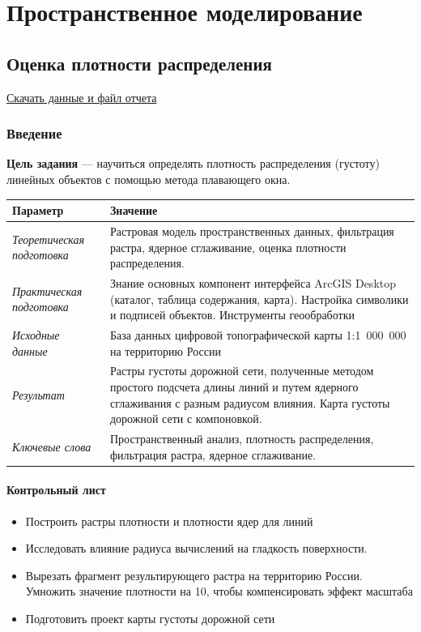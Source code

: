 \documentclass[12pt,]{book}
\providecommand{\tightlist}{%
  \setlength{\itemsep}{0pt}\setlength{\parskip}{0pt}}
\begin{document}
\hypertarget{part---3}{%
\part{Пространственное моделирование}\label{part---3}}

\hypertarget{density-analysis}{%
\chapter{Оценка плотности распределения}\label{density-analysis}}

\href{http://autolab.geogr.msu.ru/gis/data/Ex16.zip}{Скачать данные и файл отчета}

\hypertarget{density-analysis-intro}{%
\section{Введение}\label{density-analysis-intro}}

\textbf{Цель задания} --- научиться определять плотность распределения (густоту) линейных объектов с помощью метода плавающего окна.

\begin{longtable}[]{@{}ll@{}}
\toprule
Параметр & Значение\tabularnewline
\midrule
\endhead
\emph{Теоретическая подготовка} & Растровая модель пространственных данных, фильтрация растра, ядерное сглаживание, оценка плотности распределения.\tabularnewline
\emph{Практическая подготовка} & Знание основных компонент интерфейса ArcGIS Desktop (каталог, таблица содержания, карта). Настройка символики и подписей объектов. Инструменты геообработки\tabularnewline
\emph{Исходные данные} & База данных цифровой топографической карты 1:1~000~000 на территорию России\tabularnewline
\emph{Результат} & Растры густоты дорожной сети, полученные методом простого подсчета длины линий и путем ядерного сглаживания с разным радиусом влияния. Карта густоты дорожной сети с компоновкой.\tabularnewline
\emph{Ключевые слова} & Пространственный анализ, плотность распределения, фильтрация растра, ядерное сглаживание.\tabularnewline
\bottomrule
\end{longtable}

\hypertarget{density-analysis-control}{%
\subsection{Контрольный лист}\label{density-analysis-control}}

\begin{itemize}
\tightlist
\item
  Построить растры плотности и плотности ядер для линий
\item
  Исследовать влияние радиуса вычислений на гладкость поверхности.
\item
  Вырезать фрагмент результирующего растра на территорию России. Умножить значение плотности на 10, чтобы компенсировать эффект масштаба
\item
  Подготовить проект карты густоты дорожной сети
\end{itemize}
\end{document}
